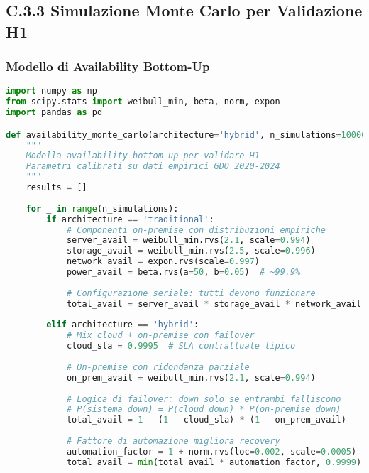 
\subsection{\texorpdfstring{\textbf{C.3.3 Simulazione Monte Carlo per Validazione H1}}{C.3.3 - Simulazione Monte Carlo per Validazione H1}}

\subsubsection{Modello di Availability Bottom-Up}

\begin{lstlisting}[language=Python, caption=Modellazione Availability per Architetture Ibride]
import numpy as np
from scipy.stats import weibull_min, beta, norm, expon
import pandas as pd

def availability_monte_carlo(architecture='hybrid', n_simulations=10000):
    """
    Modella availability bottom-up per validare H1
    Parametri calibrati su dati empirici GDO 2020-2024
    """
    results = []
    
    for _ in range(n_simulations):
        if architecture == 'traditional':
            # Componenti on-premise con distribuzioni empiriche
            server_avail = weibull_min.rvs(2.1, scale=0.994)
            storage_avail = weibull_min.rvs(2.5, scale=0.996)
            network_avail = expon.rvs(scale=0.997)
            power_avail = beta.rvs(a=50, b=0.05)  # ~99.9%
            
            # Configurazione seriale: tutti devono funzionare
            total_avail = server_avail * storage_avail * network_avail * power_avail
            
        elif architecture == 'hybrid':
            # Mix cloud + on-premise con failover
            cloud_sla = 0.9995  # SLA contrattuale tipico
            
            # On-premise con ridondanza parziale
            on_prem_avail = weibull_min.rvs(2.1, scale=0.994)
            
            # Logica di failover: down solo se entrambi falliscono
            # P(sistema down) = P(cloud down) * P(on-premise down)
            total_avail = 1 - (1 - cloud_sla) * (1 - on_prem_avail)
            
            # Fattore di automazione migliora recovery
            automation_factor = 1 + norm.rvs(loc=0.002, scale=0.0005)
            total_avail = min(total_avail * automation_factor, 0.9999)
            

\end{lstlisting}
